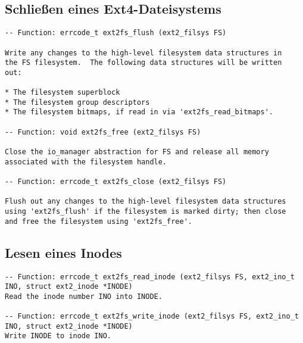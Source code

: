 \documentclass[11pt,a4paper]{article}
\begin{document}
\subsection{Schließen eines Ext4-Dateisystems}
\begin{verbatim}
-- Function: errcode_t ext2fs_flush (ext2_filsys FS)

Write any changes to the high-level filesystem data structures in
the FS filesystem.  The following data structures will be written
out:

* The filesystem superblock
* The filesystem group descriptors
* The filesystem bitmaps, if read in via 'ext2fs_read_bitmaps'.

-- Function: void ext2fs_free (ext2_filsys FS)

Close the io_manager abstraction for FS and release all memory
associated with the filesystem handle.

-- Function: errcode_t ext2fs_close (ext2_filsys FS)

Flush out any changes to the high-level filesystem data structures
using 'ext2fs_flush' if the filesystem is marked dirty; then close
and free the filesystem using 'ext2fs_free'.

\end{verbatim}

\subsection{Lesen eines Inodes}
\begin{verbatim}
-- Function: errcode_t ext2fs_read_inode (ext2_filsys FS, ext2_ino_t
INO, struct ext2_inode *INODE)
Read the inode number INO into INODE.

-- Function: errcode_t ext2fs_write_inode (ext2_filsys FS, ext2_ino_t
INO, struct ext2_inode *INODE)
Write INODE to inode INO. 

\end{verbatim}
\end{document}
